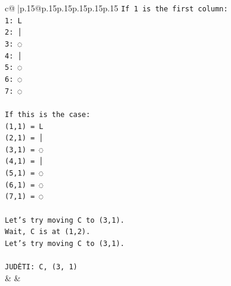 \documentclass{article}
\begin{document}
{\begin{supertabular}{c@{$\;$}|p{.15\linewidth}@{}p{.15\linewidth}p{.15\linewidth}p{.15\linewidth}p{.15\linewidth}p{.15\linewidth}}
{{{\texttt{If 1 is the first column:} \\
\texttt{1: L} \\
\texttt{2: │} \\
\texttt{3: ◌} \\
\texttt{4: │} \\
\texttt{5: ◌} \\
\texttt{6: ◌} \\
\texttt{7: ◌} \\
\\ 
\texttt{If this is the case:} \\
\texttt{(1,1) = L} \\
\texttt{(2,1) = │} \\
\texttt{(3,1) = ◌} \\
\texttt{(4,1) = │} \\
\texttt{(5,1) = ◌} \\
\texttt{(6,1) = ◌} \\
\texttt{(7,1) = ◌} \\
\\ 
\texttt{Let's try moving C to (3,1).} \\
\texttt{Wait, C is at (1,2).} \\
\texttt{Let's try moving C to (3,1).} \\
\\ 
\texttt{JUDĖTI: C, (3, 1)} \\
            }
        }
    }
    & & \\ \\


\end{supertabular}}
\end{document}
